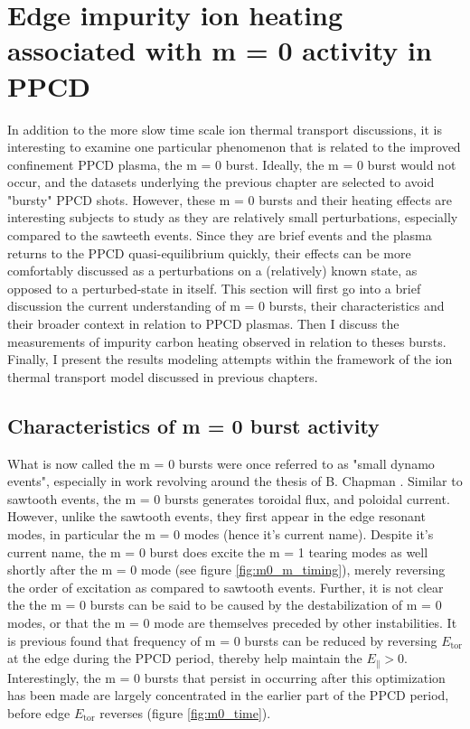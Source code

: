 \chapter{Edge impurity ion heating associated with m = 0 activity in PPCD}\label{ch:m0}

In addition to the more slow time scale ion thermal transport discussions, it is interesting to examine one particular phenomenon that is related to the improved confinement PPCD plasma, the m = 0 burst. Ideally, the m = 0 burst would not occur, and the datasets underlying the previous chapter are selected to avoid "bursty" PPCD shots. However, these m = 0 bursts and their heating effects are interesting subjects to study as they are relatively small perturbations, especially compared to the sawteeth events. Since they are brief events and the plasma returns to the PPCD quasi-equilibrium quickly, their effects can be more comfortably discussed as a perturbations on a (relatively) known state, as opposed to a perturbed-state in itself.  This section will first go into a brief discussion the current understanding of m = 0 bursts, their characteristics and their broader context in relation to PPCD plasmas. Then I discuss the measurements of impurity carbon heating observed in relation to theses bursts. Finally, I present the results modeling attempts within the framework of the ion thermal transport model discussed in previous chapters.

\section{Characteristics of m = 0 burst activity}
What is now called the m = 0 bursts were once referred to as "small dynamo events", especially in work revolving around the thesis of B. Chapman \cite{Chapman1997}. Similar to sawtooth events, the m = 0 bursts generates toroidal flux, and poloidal current. However, unlike the sawtooth events, they first appear in the edge resonant modes, in particular the m = 0 modes (hence it's current name). Despite it's current name, the m = 0 burst does excite the m = 1 tearing modes as well shortly after the m = 0 mode (see figure \ref{fig:m0_m_timing}), merely reversing the order of excitation as compared to sawtooth events. Further, it is not clear the the m = 0 bursts can be said to be caused by the destabilization of m = 0 modes, or that the m = 0 mode are themselves preceded by other instabilities. It is previous found that frequency of m = 0 bursts can be reduced by reversing $E_{\text{tor}}$ at the edge during the PPCD period, thereby help maintain the $E_\parallel > 0$\cite{Chapman2001}. Interestingly, the m = 0 bursts that persist in occurring after this optimization has been made are largely concentrated in the earlier part of the PPCD period, before edge $E_{\text{tor}}$ reverses (figure \ref{fig:m0_time}).

